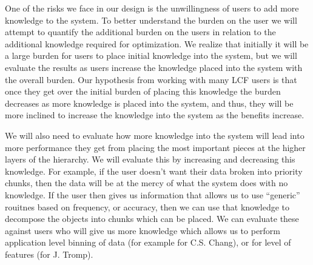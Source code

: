 One of the risks we face in our design is the unwillingness of users to add
more knowledge to the system. To better understand the burden on the user we
will attempt to quantify the additional burden on the users in relation to
the additional knowledge required for optimization. 
 We realize that initially it will be a large burden for users to
place initial knowledge into the system, but we will evaluate the results as
users increase the knowledge placed into the system with the overall burden.
Our hypothesis from working with many LCF users is that once they get over
the initial burden of placing this knowledge the burden decreases as more
knowledge is placed into the system, and thus, they will be more inclined to
increase the knowledge into the system as the benefits increase.

We will also need to evaluate how more knowledge into the system will lead
into more performance they get from placing the most important pieces at the
higher layers of the hierarchy. We will evaluate this by increasing and
decreasing this knowledge. For example, if the user doesn't want their data
broken into priority chunks, then the data will be at the mercy of what the
system does with no knowledge. If the user then gives us information that
allows us to use ``generic'' rouitnes based on frequency, or accuracy, then
we can use that knowledge to decompose the objects into chunks which can be
placed. We can evaluate these against users who will give us more knowledge
which allows us to perform application level binning of data (for example
for C.S. Chang), or for level of features (for J. Tromp).






